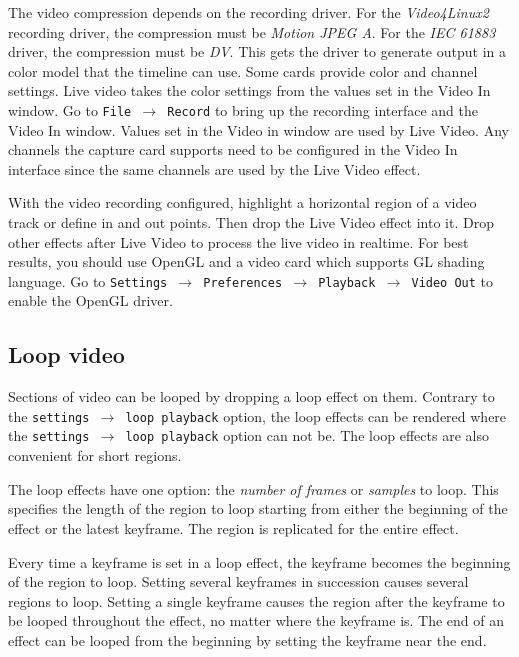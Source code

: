 The video compression depends on the recording driver. For the \textit{Video4Linux2} recording driver, the compression must be \textit{Motion JPEG A}. For the \textit{IEC 61883} driver, the compression must be \textit{DV}. This gets the driver to generate output in a color model that the timeline can use. Some cards provide color and channel settings. Live video takes the color settings from the values set in the Video In window. Go to \texttt{File $\rightarrow$ Record} to bring up the recording interface and the Video In window. Values set in the Video in window are used by Live Video. Any channels the capture card supports need to be configured in the Video In interface since the same channels are used by the Live Video effect.

With the video recording configured, highlight a horizontal region of a video track or define in and out points. Then drop the Live Video effect into it. Drop other effects after Live Video to process the live video in realtime. For best results, you should use OpenGL and a video card which supports GL shading language. Go to \texttt{Settings $\rightarrow$ Preferences $\rightarrow$ Playback $\rightarrow$ Video Out} to enable the OpenGL driver.

\subsection{Loop video}%
\label{sub:loop_video}

Sections of video can be looped by dropping a loop effect on them. Contrary to the \texttt{settings $\rightarrow$ loop playback} option, the loop effects can be rendered where the \texttt{settings $\rightarrow$ loop playback} option can not be. The loop effects are also convenient for short regions.

The loop effects have one option: the \textit{number of frames} or \textit{samples} to loop. This specifies the length of the region to loop starting from either the beginning of the effect or the latest keyframe. The region is replicated for the entire effect.

Every time a keyframe is set in a loop effect, the keyframe becomes the beginning of the region to loop. Setting several keyframes in succession causes several regions to loop. Setting a single keyframe causes the region after the keyframe to be looped throughout the effect, no matter where the keyframe is. The end of an effect can be looped from the beginning by setting the keyframe near the end.

